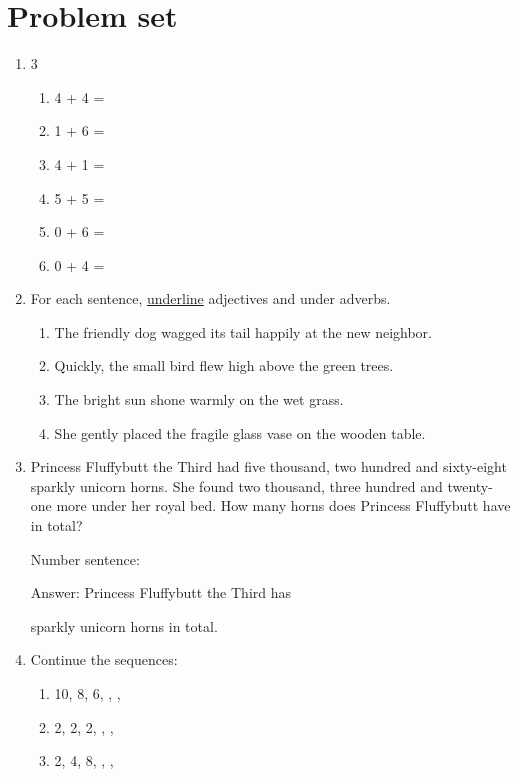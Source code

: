\documentclass{tufte-book}
\begin{document}
\clearpage\section{Problem set }

\begin{enumerate}
  \item
  \begin{multicols}{3}
    \begin{enumerate}\bigskip
      \item 4 + 4 = \dotfill\bigskip
      \item 1 + 6 = \dotfill
      \item 4 + 1 = \dotfill\bigskip
      \item 5 + 5 = \dotfill
      \item 0 + 6 = \dotfill\bigskip
      \item 0 + 4 = \dotfill
    \end{enumerate}
  \end{multicols}

  \item For each sentence, \underline{underline} adjectives and  under adverbs.
  \begin{enumerate}
    \item The friendly dog wagged its tail happily at the new neighbor.
    \item Quickly, the small bird flew high above the green trees.
    \item The bright sun shone warmly on the wet grass.
    \item She gently placed the fragile glass vase on the wooden table.
  \end{enumerate}

  \item Princess Fluffybutt the Third had five thousand, two hundred and sixty-eight sparkly unicorn horns. She found two thousand, three hundred and twenty-one more under her royal bed.
  How many horns does Princess Fluffybutt have in total?\bigskip\par
  Number sentence: \dotfill\bigskip\par
  Answer: Princess Fluffybutt the Third has 
  \dotfill\bigskip\par\dotfill\bigskip\par\mbox{}\dotfill\bigskip\par\mbox{}\dotfill\bigskip
   sparkly unicorn horns in total.


\item Continue the sequences:
\begin{enumerate}\bigskip
  \item 10, 8, 6, \dotfill, \dotfill, \dotfill\bigskip
  \item 2, 2, 2, \dotfill, \dotfill, \dotfill\bigskip
  \item 2, 4, 8, \dotfill, \dotfill, \dotfill\bigskip
\end{enumerate}
\end{enumerate}
\end{document}

